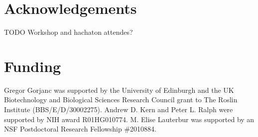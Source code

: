 \documentclass[hidelinks]{article}
\begin{document}
\hypertarget{acknowledgements}{%
\section{Acknowledgements}\label{acknowledgements}}

TODO Workshop and hachaton attendes?

\hypertarget{funding}{%
\section{Funding}\label{funding}}

Gregor Gorjanc was supported by the University of Edinburgh and the UK
Biotechnology and Biological Sciences Research Council grant to The
Roslin Institute (BBS/E/D/30002275). Andrew D. Kern and Peter L. Ralph
were supported by NIH award R01HG010774. M. Elise Lauterbur was
supported by an NSF Postdoctoral Research Fellowship \#2010884.


\end{document}
